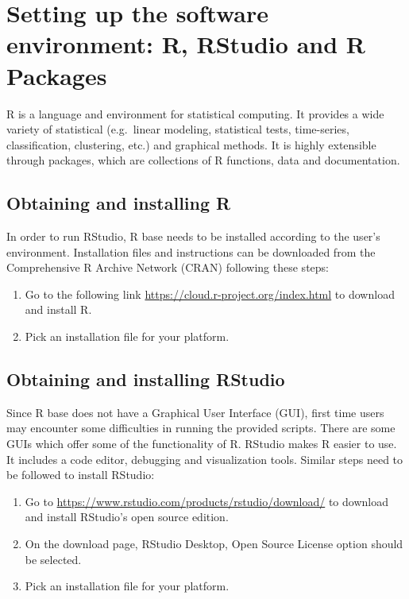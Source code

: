 \documentclass[
  10pt,
  b5paper,
]{book}
\providecommand{\tightlist}{%
  \setlength{\itemsep}{0pt}\setlength{\parskip}{0pt}}
\begin{document}
\hypertarget{setting-up-the-software-environment-r-rstudio-and-r-packages}{%
\section{Setting up the software environment: R, RStudio and R Packages}\label{setting-up-the-software-environment-r-rstudio-and-r-packages}}

R is a language and environment for statistical computing. It provides a wide variety of statistical (e.g.~linear modeling, statistical tests, time-series, classification, clustering, etc.) and graphical methods. It is highly extensible through packages, which are collections of R functions, data and documentation.

\hypertarget{obtaining-and-installing-r}{%
\subsection{Obtaining and installing R}\label{obtaining-and-installing-r}}

In order to run RStudio, R base needs to be installed according to the user's environment. Installation files and instructions can be downloaded from the Comprehensive R Archive Network (CRAN) following these steps:

\begin{enumerate}
\def\labelenumi{\arabic{enumi}.}
\tightlist
\item
  Go to the following link \url{https://cloud.r-project.org/index.html} to download and install R.
\item
  Pick an installation file for your platform.
\end{enumerate}

\hypertarget{obtaining-and-installing-rstudio}{%
\subsection{Obtaining and installing RStudio}\label{obtaining-and-installing-rstudio}}

Since R base does not have a Graphical User Interface (GUI), first time users may encounter some difficulties in running the provided scripts. There are some GUIs which offer some of the functionality of R. RStudio makes R easier to use. It includes a code editor, debugging and visualization tools. Similar steps need to be followed to install RStudio:

\begin{enumerate}
\def\labelenumi{\arabic{enumi}.}
\tightlist
\item
  Go to \url{https://www.rstudio.com/products/rstudio/download/} to download and install RStudio's open source edition.
\item
  On the download page, RStudio Desktop, Open Source License option should be selected.
\item
  Pick an installation file for your platform.
\end{enumerate}
\end{document}
